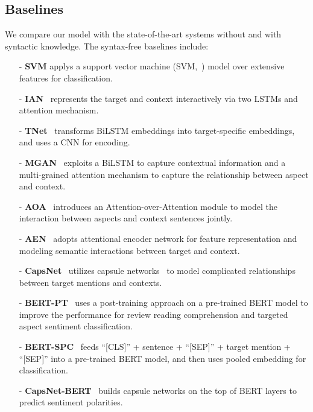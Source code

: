 \documentclass[journal]{IEEEtran}
\begin{document}
	\subsection{Baselines}
	We compare our model with the state-of-the-art systems without and with syntactic knowledge.
	The syntax-free baselines include:
	\begin{itemize}
		
		\item[-] \textbf{SVM} applys a support vector machine (SVM,~\cite{Cortes95support-vectornetworks}) model over extensive features for classification.
		
		\item[-] \textbf{IAN}~\cite{ma2017-ijcai} represents the target and context interactively via two LSTMs and attention mechanism. 
		
		\item[-] \textbf{TNet}~\cite{li-etal-2018-transformation} transforms BiLSTM embeddings into target-specific embeddings, and uses a CNN for encoding. 
		
		\item[-] \textbf{MGAN}~\cite{fan-etal-2018-multi} exploits a BiLSTM to capture contextual information and a multi-grained attention mechanism to capture the relationship between aspect and context.
		
		\item[-] \textbf{AOA}~\cite{huang2018aspect} introduces an Attention-over-Attention module to model the interaction between aspects and context sentences jointly.
		
		\item[-] \textbf{AEN}~\cite{Song2019AttentionalEN} adopts attentional encoder network for feature representation and modeling semantic interactions between target and context.
		
		\item[-] {\textbf{CapsNet}~\cite{jiang-etal-2019-challenge} utilizes capsule networks~\cite{Sabour17nips} to model complicated relationships between target mentions and contexts.}
		
		\item[-] \textbf{BERT-PT}~\cite{xu-etal-2019-bert} uses a post-training approach on a pre-trained BERT model to improve the performance for review
		reading comprehension and targeted aspect sentiment classification. 
		
		\item[-] \textbf{BERT-SPC}~\cite{Song2019AttentionalEN} feeds ``[CLS]'' + sentence + ``[SEP]'' + target mention + ``[SEP]'' into a pre-trained BERT model, and then uses pooled embedding for classification.
		
		\item[-] {\textbf{CapsNet-BERT}~\cite{jiang-etal-2019-challenge} builds capsule networks on the top of BERT layers to predict sentiment polarities.}
	\end{itemize}
	
\end{document}
